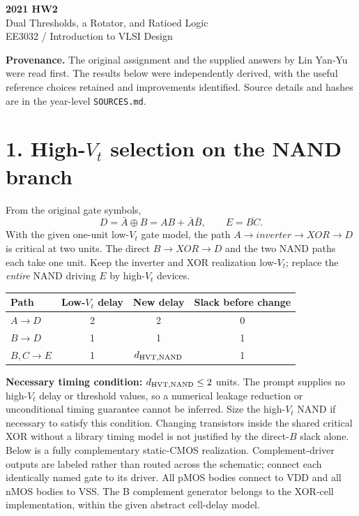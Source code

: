 \documentclass[11pt,a4paper]{article}
\begin{document}
\begin{center}{\LARGE\bfseries 2021 HW2}\\[4pt]{\large Dual Thresholds, a Rotator, and Ratioed Logic}\\[4pt]{\small EE3032 / Introduction to VLSI Design}\end{center}
\textbf{Provenance.} The original assignment and the supplied answers by Lin Yan-Yu were read first. The results below were independently derived, with the useful reference choices retained and improvements identified. Source details and hashes are in the year-level \texttt{SOURCES.md}.


\section*{1. High-$V_t$ selection on the NAND branch}
From the original gate symbols,
\[
 D=\bar A\oplus B=AB+\bar A\bar B,\qquad E=\overline{BC}.
\]
With the given one-unit low-$V_t$ gate model, the path $A\to inverter\to XOR\to D$ is critical at two units. The direct $B\to XOR\to D$ and the two NAND paths each take one unit. Keep the inverter and XOR realization low-$V_t$; replace the \emph{entire} NAND driving $E$ by high-$V_t$ devices.
\begin{center}\begin{tabular}{lccc}\toprule
Path&Low-$V_t$ delay&New delay&Slack before change\\\midrule
$A\to D$&2&2&0\\$B\to D$&1&1&1\\$B,C\to E$&1&$d_{\rm HVT,NAND}$&1\\\bottomrule
\end{tabular}\end{center}
\textbf{Necessary timing condition:} $d_{\rm HVT,NAND}\le2$ units. The prompt supplies no high-$V_t$ delay or threshold values, so a numerical leakage reduction or unconditional timing guarantee cannot be inferred. Size the high-$V_t$ NAND if necessary to satisfy this condition. Changing transistors inside the shared critical XOR without a library timing model is not justified by the direct-$B$ slack alone.
Below is a fully complementary static-CMOS realization. Complement-driver outputs are labeled rather than routed across the schematic; connect each identically named gate to its driver. All pMOS bodies connect to VDD and all nMOS bodies to VSS. The B complement generator belongs to the XOR-cell implementation, within the given abstract cell-delay model.
\end{document}
